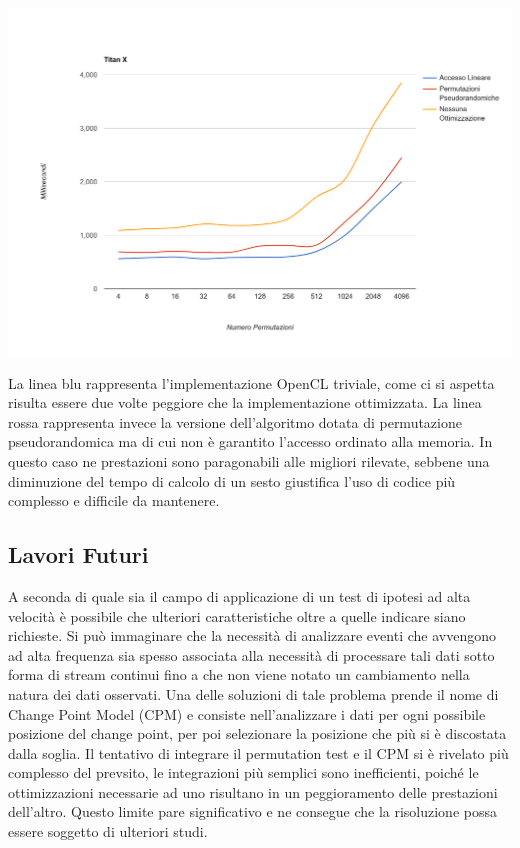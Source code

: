 \begin{center}
\includegraphics[width=\linewidth]{ott}
\end{center}
La linea blu rappresenta l'implementazione OpenCL triviale, come ci si aspetta risulta essere due volte peggiore che la implementazione ottimizzata. La linea rossa rappresenta invece la versione dell'algoritmo dotata di permutazione pseudorandomica ma di cui non è garantito l'accesso ordinato alla memoria. In questo caso ne prestazioni sono paragonabili alle migliori rilevate, sebbene una diminuzione del tempo di calcolo di un sesto giustifica l'uso di codice più complesso e difficile da mantenere.

\subsection{Lavori Futuri}
A seconda di quale sia il campo di applicazione di un test di ipotesi ad alta velocità è possibile che ulteriori caratteristiche oltre a quelle indicare siano richieste. Si può immaginare che la necessità di analizzare eventi che avvengono ad alta frequenza sia spesso associata alla necessità di processare tali dati sotto forma di stream continui fino a che non viene notato un cambiamento nella natura dei dati osservati.
Una delle soluzioni di tale problema prende il nome di Change Point Model (CPM) e consiste nell'analizzare i dati per ogni possibile posizione del change point, per poi selezionare la posizione che più si è discostata dalla soglia. Il tentativo di integrare il permutation test e il CPM si è rivelato più complesso del prevsito, le integrazioni più semplici sono inefficienti, poiché le ottimizzazioni necessarie ad uno risultano in un peggioramento delle prestazioni dell'altro. Questo limite pare significativo e ne consegue che la risoluzione possa essere soggetto di ulteriori studi.